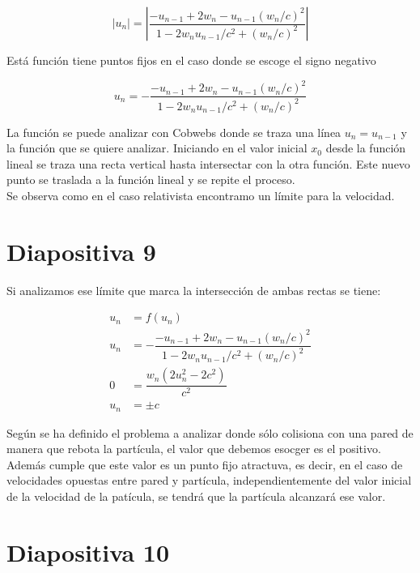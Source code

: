 \documentclass[11pt, spanish]{article}
\begin{document}
\begin{equation}
    \left| u_n \right| = \left|  \dfrac{-u_{n-1} + 2w_n - u_{n-1}(w_n/c)^2}{1 - 2w_n u_{n-1}/c^2 + (w_n/c)^2} \right|
\end{equation}

Está función tiene puntos fijos en el caso donde se escoge el signo negativo 

\begin{equation*}
    u_n = -\dfrac{-u_{n-1} + 2w_n - u_{n-1}(w_n/c)^2}{1 - 2w_n u_{n-1}/c^2 + (w_n/c)^2}
\end{equation*}

La función se puede analizar con Cobwebs donde se traza una línea \( u_n = u_{n-1} \) y la función que se quiere analizar. Iniciando en el valor inicial \( x_0 \) desde la función lineal se traza una recta vertical hasta intersectar con la otra función. Este nuevo punto se traslada a la función lineal y se repite el proceso. \\

Se observa como en el caso relativista encontramo un límite para la velocidad. 

\section{Diapositiva 9}

Si analizamos ese límite que marca la intersección de ambas rectas se tiene:

\begin{align}
    u_n &= f(u_n) \\
    u_n &= -\dfrac{-u_{n-1} + 2w_n - u_{n-1}(w_n/c)^2}{1 - 2w_n u_{n-1}/c^2 + (w_n/c)^2} \\
    0 &= \dfrac{w_n\left( 2u_n^2-2c^2 \right)}{c^2} \\
    u_n &= \pm c 
\end{align}

Según se ha definido el problema a analizar donde sólo colisiona con una pared de manera que rebota la partícula, el valor que debemos esocger es el positivo. Además cumple que este valor es un punto fijo atractuva, es decir, en el caso de velocidades opuestas entre pared y partícula, independientemente del valor inicial de la velocidad de la patícula, se tendrá que la partícula alcanzará ese valor. 

\section{Diapositiva 10}
\end{document}

